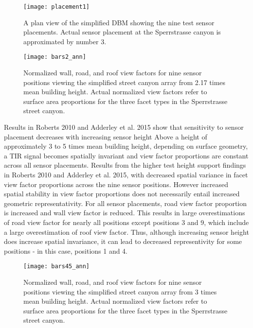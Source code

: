  \begin{figure}[H]
	\centering
	\texttt{[image: placement1]}
	\caption{A plan view of the simplified DBM showing the nine test sensor placements. Actual sensor placement at the Sperrstrasse canyon is approximated by number 3.}
	\label{placement}
\end{figure}

 \begin{figure}[H]
	\centering
	\texttt{[image: bars2\_ann]}
	\caption{Normalized wall, road, and roof view factors for nine sensor positions viewing the simplified street canyon array from 2.17 times mean building height. Actual normalized view factors refer to surface area proportions for the three facet types in the Sperrstrasse street canyon. }
	\label{bars1}
 \end{figure}

Results in Roberts 2010 and Adderley et al. 2015 show that sensitivity to sensor placement decreases with increasing sensor height  Above a height of approximately 3 to 5 times mean building height, depending on surface geometry, a TIR signal becomes spatially invariant and view factor proportions are constant across all sensor placements. Results from the higher test height support findings in Roberts 2010 and Adderley et al. 2015, with decreased spatial variance in facet view factor proportions across the nine sensor positions. However increased spatial stability in view factor proportions does not necessarily entail increased geometric representativity. For all sensor placements, road view factor proportion is increased and wall view factor is reduced. This results in large overestimations of road view factor for nearly all positions except positions 3 and 9, which include a large overestimation of roof view factor. Thus, although increasing sensor height does increase spatial invariance, it can lead to decreased representivity for some positions - in this case, positions 1 and 4.

\begin{figure}[H]
	\centering
	\texttt{[image: bars45\_ann]}
	\caption{Normalized wall, road, and roof view factors for nine sensor positions viewing the simplified street canyon array from 3 times mean building height. Actual normalized view factors refer to surface area proportions for the three facet types in the Sperrstrasse street canyon. }
	\label{bars45}
\end{figure}

